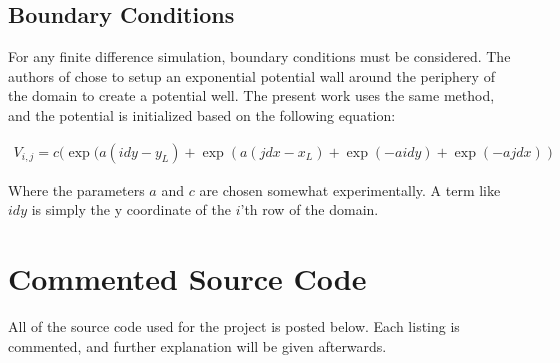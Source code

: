 \documentclass[letterpaper,12pt]{article}
\begin{document}
\subsection{Boundary Conditions}

For any finite difference simulation, boundary conditions must be considered.  The authors of \citep{reference} chose to setup an exponential potential wall around the periphery of the domain to create a potential well.  The present work uses the same method, and the potential is initialized based on the following equation:

\begin{equation}
\begin{split}
V_{i,j} = c( \exp(a(idy-y_L) + \exp(a(jdx-x_L) + \exp(-aidy) + \exp(-a j dx) )
\end{split}
\end{equation}

Where the parameters $a$ and $c$ are chosen somewhat experimentally.  A term like $idy$ is simply the y coordinate of the $i$'th row of the domain.   
   
\section{\bf Commented Source Code}

All of the source code used for the project is posted below.  Each listing
is commented, and further explanation will be given afterwards.
\end{document}
